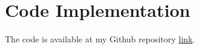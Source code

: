 
\chapter{Code Implementation} %

\label{AppendixD} %

The code is available at my Github repository \href{https://github.com/MrPPL}{link}.


